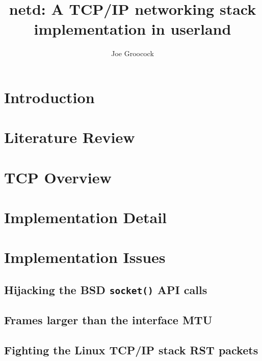 \documentclass[11pt,a4paper,british]{bhamarticle}
\title{netd: A TCP/IP networking stack implementation in userland}
\author{Joe Groocock}
\begin{document}

\maketitle

\begin{abstract}
\end{abstract}

\tableofcontents
\newpage


\section{Introduction}

\pagebreak
\section{Literature Review}

\section{TCP Overview}

\section{Implementation Detail}

\section{Implementation Issues}
\subsection{Hijacking the BSD \texttt{socket()} API calls} %
% 

\subsection{Frames larger than the interface MTU}

\subsection{Fighting the Linux TCP/IP stack RST packets}
\end{document}
